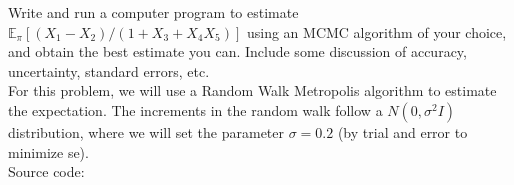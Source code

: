 
Write and run a computer program to estimate $\mathbb{E}_\pi[(X_1-X_2)/(1+X_3+X_4X_5)]$ using an MCMC algorithm of your choice, and obtain the best estimate you can. Include some discussion of accuracy, uncertainty, standard errors, etc.\\

For this problem, we will use a Random Walk Metropolis algorithm to estimate the expectation. The increments in the random walk follow a $N(0,\sigma^2 I)$ distribution, where we will set the parameter $\sigma=0.2$ (by trial and error to minimize se).\\

Source code:
\begin{knitrout}
\color{fgcolor}\begin{kframe}
\begin{alltt}

 \hlkwb{=}  \hlkwb{=}  \hlkwb{=}  \hlkwb{=} 

 \hlkwb{=} \hlstd{(}\hlstd{,}\hlstd{,}\hlstd{,}\hlstd{,}\hlopt{-}\hlopt{/}\hlstd{(}\hlopt{+}\hlopt{+}\hlopt{*}
 \hlkwb{=} \hlstd{(}\hlstd{,}\hlstd{,}\hlstd{,}\hlstd{,}\hlstd{) \{}
   \hlopt{<=} \hlopt{|} \hlopt{>=} \hlopt{|} \hlopt{<=} \hlopt{|} \hlopt{>=} \hlopt{|}\hlopt{<=} \hlopt{|} \hlopt{>=} \hlopt{|}
      \hlopt{<=} \hlopt{|} \hlopt{>=} \hlopt{|} \hlopt{<=} \hlopt{|} \hlopt{>=}\hlstd{)}
    \hlopt{+}\hlopt{+}\hlstd{)}\hlopt{^}\hlopt{+}\hlstd{)}\hlopt{*}\hlstd{(}\hlopt{+}\hlopt{+}\hlstd{)}\hlopt{*}\hlopt{*}\hlstd{(}\hlstd{((}\hlopt{-}\hlopt{*}\hlopt{*}\hlopt{-}\hlopt{*}\hlopt{^}\hlopt{+}\hlstd{)}
\hlstd{\}}

 \hlkwb{=} 
 \hlkwb{=} 
 \hlkwb{=} 


\end{alltt}
\end{kframe}
\end{knitrout}
